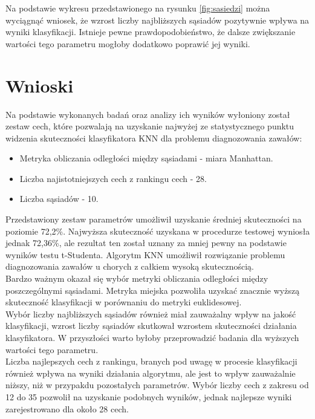 \documentclass{article}
\begin{document}
\noindent
Na podstawie wykresu przedstawionego na rysunku \ref{fig:sasiedzi} można wyciągnąć wniosek, że wzrost liczby najbliższych sąsiadów pozytywnie wpływa na wyniki klasyfikacji. Istnieje pewne prawdopodobieństwo, że dalsze zwiększanie wartości tego parametru mogłoby dodatkowo poprawić jej wyniki.

\newpage

\section{Wnioski}
Na podstawie wykonanych badań oraz analizy ich wyników wyłoniony został zestaw cech, które pozwalają na uzyskanie najwyżej ze statystycznego punktu widzenia skuteczności klasyfikatora KNN dla problemu diagnozowania zawałów:
\begin{itemize}
    \item Metryka obliczania odległości między sąsiadami - miara Manhattan.
    \item Liczba najistotniejszych cech z rankingu cech - 28.
    \item Liczba sąsiadów - 10.
\end{itemize}
Przedstawiony zestaw parametrów umożliwił uzyskanie średniej skuteczności na poziomie 72,2\%. Najwyższa skuteczność uzyskana w procedurze testowej wyniosła jednak 72,36\%, ale rezultat ten został uznany za mniej pewny na podstawie wyników testu t-Studenta. Algorytm KNN umożliwił rozwiązanie problemu diagnozowania zawałów u chorych z całkiem wysoką skutecznością.\\

Bardzo ważnym okazał się wybór metryki obliczania odległości między poszczególnymi sąsiadami. Metryka miejska pozwoliła uzyskać znacznie wyższą skuteczność klasyfikacji w porównaniu do metryki euklidesowej.\\

Wybór liczby najbliższych sąsiadów również miał zauważalny wpływ na jakość klasyfikacji, wzrost liczby sąsiadów skutkował wzrostem skuteczności działania klasyfikatora. W przyszłości warto byłoby przeprowadzić badania dla wyższych wartości tego parametru.\\

Liczba najlepszych cech z rankingu, branych pod uwagę w procesie klasyfikacji również wpływa na wyniki działania algorytmu, ale jest to wpływ zauważalnie niższy, niż w przypakdu pozostałych parametrów. Wybór liczby cech z zakresu od 12 do 35 pozwolił na uzyskanie podobnych wyników, jednak najlepsze wyniki zarejestrowano dla około 28 cech.
\end{document}
